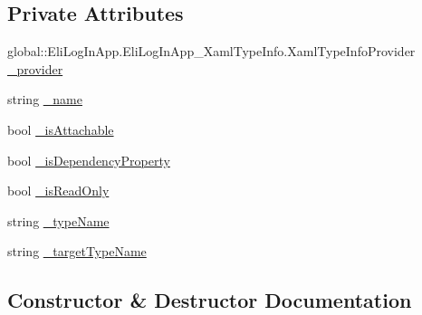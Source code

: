 \subsection*{Private Attributes}
\begin{DoxyCompactItemize}
\item 
global\+::\+Eli\+Log\+In\+App.\+Eli\+Log\+In\+App\+\_\+\+Xaml\+Type\+Info.\+Xaml\+Type\+Info\+Provider \hyperlink{class_eli_log_in_app_1_1_eli_log_in_app___xaml_type_info_1_1_xaml_member_a5406f372e29a8fb784ba14226264c17f}{\+\_\+provider}
\item 
string \hyperlink{class_eli_log_in_app_1_1_eli_log_in_app___xaml_type_info_1_1_xaml_member_a364b3340912db2c5b709844be650011e}{\+\_\+name}
\item 
bool \hyperlink{class_eli_log_in_app_1_1_eli_log_in_app___xaml_type_info_1_1_xaml_member_a6d09a5256f274c55c6039ad5812fddb7}{\+\_\+is\+Attachable}
\item 
bool \hyperlink{class_eli_log_in_app_1_1_eli_log_in_app___xaml_type_info_1_1_xaml_member_a148c3a3cf1f2cac95e7b4ead9b01d25c}{\+\_\+is\+Dependency\+Property}
\item 
bool \hyperlink{class_eli_log_in_app_1_1_eli_log_in_app___xaml_type_info_1_1_xaml_member_a3f7c42e1d919c662b500abd937b6c9fe}{\+\_\+is\+Read\+Only}
\item 
string \hyperlink{class_eli_log_in_app_1_1_eli_log_in_app___xaml_type_info_1_1_xaml_member_a0baae55d3adaef2b10c8a2ab28e495f7}{\+\_\+type\+Name}
\item 
string \hyperlink{class_eli_log_in_app_1_1_eli_log_in_app___xaml_type_info_1_1_xaml_member_a174af7886ca980eb02a2091c9bd8fdab}{\+\_\+target\+Type\+Name}
\end{DoxyCompactItemize}


\subsection{Constructor \& Destructor Documentation}
\mbox{\label{class_eli_log_in_app_1_1_eli_log_in_app___xaml_type_info_1_1_xaml_member_a8abdb999c007e272946172e1027e0a57}} 
